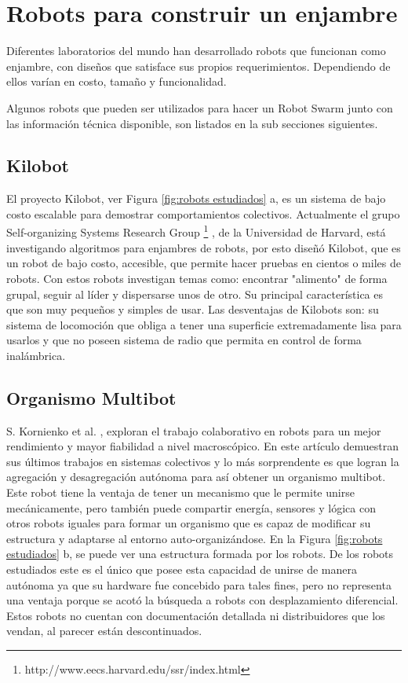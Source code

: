 \section{Robots para construir un enjambre}

Diferentes laboratorios del mundo han desarrollado robots que funcionan como enjambre, con diseños que satisface sus propios requerimientos. Dependiendo de ellos varían en costo, tamaño y funcionalidad.

Algunos robots que pueden ser utilizados para hacer un Robot Swarm junto con las información técnica disponible, son listados en la sub secciones siguientes.

\subsection{Kilobot}
El proyecto Kilobot, ver Figura \ref{fig:robots estudiados} a, es un sistema de bajo costo escalable para demostrar comportamientos colectivos. Actualmente el grupo Self-organizing Systems Research Group \footnote{http://www.eecs.harvard.edu/ssr/index.html} , de la Universidad de Harvard, está investigando algoritmos para enjambres de robots, por esto diseñó Kilobot, que es un robot de bajo costo, accesible,  que permite hacer pruebas en cientos o miles de robots. Con estos robots investigan temas como: encontrar "alimento" de forma grupal, seguir al líder y dispersarse unos de otro. Su principal característica es que son muy pequeños y simples de usar. Las desventajas de Kilobots son: su sistema de locomoción que obliga a tener una superficie extremadamente lisa para usarlos y que no poseen sistema de radio que permita en control de forma inalámbrica.

\subsection{Organismo Multibot}
S. Kornienko et al. \cite{5359578}, exploran el trabajo colaborativo en robots para un mejor rendimiento y mayor fiabilidad a nivel macroscópico. En este artículo demuestran sus últimos trabajos en sistemas colectivos y lo más sorprendente es que logran la agregación y desagregación autónoma para así obtener un organismo multibot. Este robot tiene la ventaja de tener un mecanismo que le permite unirse mecánicamente, pero también puede compartir energía, sensores y lógica con otros robots iguales para formar un organismo que es capaz de modificar su estructura y adaptarse al entorno auto-organizándose. En la Figura \ref{fig:robots estudiados} b, se puede ver una estructura formada por los robots. De los robots estudiados este es el único que posee esta capacidad de unirse de manera autónoma ya que su hardware fue concebido para tales fines, pero no representa una ventaja porque se acotó la búsqueda a robots con desplazamiento diferencial. Estos robots no cuentan con documentación detallada ni distribuidores que los vendan, al parecer están descontinuados.

